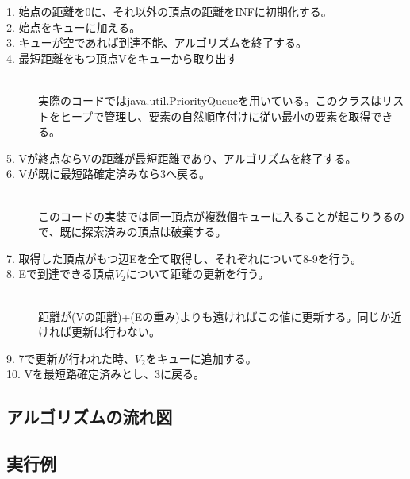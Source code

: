 \documentclass[a4j]{jarticle}
\begin{document}
\begin{description}
\begin{description}
\begin{description}
\item [1. 始点の距離を0に、それ以外の頂点の距離をINFに初期化する。]
\item [2. 始点をキューに加える。]
\item [3. キューが空であれば到達不能、アルゴリズムを終了する。]
\item [4. 最短距離をもつ頂点Vをキューから取り出す]~\\
実際のコードではjava.util.PriorityQueueを用いている。このクラスはリストをヒープで管理し、要素の自然順序付けに従い最小の要素を取得できる。
\item [5. Vが終点ならVの距離が最短距離であり、アルゴリズムを終了する。]
\item [6. Vが既に最短路確定済みなら3へ戻る。]~\\
このコードの実装では同一頂点が複数個キューに入ることが起こりうるので、既に探索済みの頂点は破棄する。
\item [7. 取得した頂点がもつ辺Eを全て取得し、それぞれについて8-9を行う。]
\item [8. Eで到達できる頂点$V_2$について距離の更新を行う。]~\\
 距離が(Vの距離)+(Eの重み)よりも遠ければこの値に更新する。同じか近ければ更新は行わない。
\item [9. 7で更新が行われた時、$V_2$をキューに追加する。]
\item [10. Vを最短路確定済みとし、3に戻る。]
\end{description}


\subsection{アルゴリズムの流れ図}
\begin{center}
\end{center}

\subsection{実行例}



\end{description}
\end{description}
\end{document}
